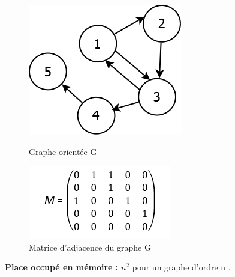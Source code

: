 \begin{figure}[H]
	\begin{minipage}[c]{.46\linewidth}
	\begin{center}
		\includegraphics[height=100 pt, width=110 pt]{./ressources/image/graphAdjace.png} 
		\caption{Graphe orientée G}
		\label{grapAdjac}
	\end{center}
	\end{minipage} 
	\begin{minipage}[c]{.46\linewidth}
	\begin{center}
		\includegraphics[height=110 pt, width=140 pt]{./ressources/image/matriceAdjac.png} 
		\caption{Matrice d'adjacence du graphe G}
		\label{matriceAdjac}
	\end{center}
	\end{minipage} 
\end{figure} 

\textbf{Place occupé en mémoire :} ${n}^{2}$ pour un graphe d'ordre n \citep{lopez2003cours}.			
